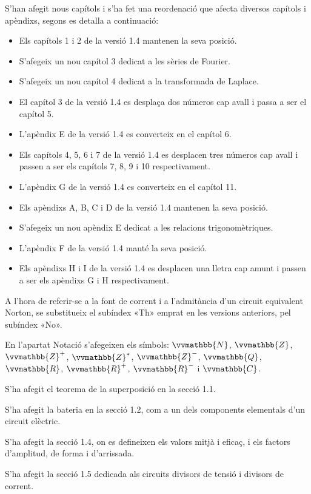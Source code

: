 S'han afegit nous capítols i s'ha fet una reordenació que afecta 
diversos capítols i apèndixs, segons es detalla a continuació:
\begin{itemize}
   \item Els capítols 1 i 2  de la versió 1.4 mantenen la seva posició.
   \item S'afegeix un nou capítol 3 dedicat a les sèries de Fourier.
   \item S'afegeix un nou capítol 4 dedicat a la transformada de Laplace.
   \item El capítol 3 de la versió 1.4 es desplaça dos números cap
    avall i passa a ser el capítol 5.
   \item L'apèndix E de la versió 1.4 es converteix en el capítol 6.
   \item Els capítols 4, 5, 6 i 7  de la versió 1.4 es desplacen tres números cap
    avall i passen a ser els capítols 7, 8, 9 i 10 respectivament.
    \item L'apèndix G de la versió 1.4 es converteix en el capítol 11.
    \item Els apèndixs A, B, C i D de la versió 1.4 mantenen la seva posició.
    \item S'afegeix un nou apèndix E dedicat a les relacions trigonomètriques.
    \item L'apèndix F de la versió 1.4 manté la seva posició.
    \item Els apèndixs H i I de la versió 1.4 es desplacen una lletra cap
    amunt i passen a ser els apèndixs G i H respectivament.
\end{itemize}


 A l'hora de referir-se a la font de corrent i a l'admitància d'un circuit equivalent
 Norton, se substitueix el subíndex «Th» emprat en les versions
anteriors, pel subíndex «No».

En l'apartat Notació s'afegeixen els símbols: $\vvmathbb{N}$,
$\vvmathbb{Z}$, $\vvmathbb{Z}^+$,  $\vvmathbb{Z}^*$, $\vvmathbb{Z}^-$,
$\vvmathbb{Q}$, $\vvmathbb{R}$, $\vvmathbb{R}^+$, $\vvmathbb{R}^-$ i
$\vvmathbb{C}$.

S'ha afegit el teorema de la superposició en la secció 1.1.


S'ha afegit la bateria en la secció 1.2, com a un
dels components elementals d'un circuit elèctric.

S'ha afegit la secció 1.4, on es defineixen els
valors mitjà i eficaç, i els factors d'amplitud, de forma i
d'arrissada.

S'ha afegit la secció 1.5 dedicada als
circuits divisors de tensió i divisors de corrent.

